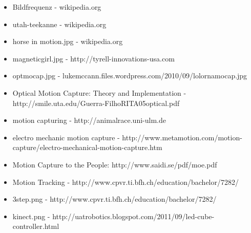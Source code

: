 \begin{itemize}
\item Bildfrequenz - wikipedia.org
\item utah-teekanne - wikipedia.org
\item horse in motion.jpg - wikipedia.org
\item magneticgirl.jpg - http://tyrell-innovations-usa.com
\item optmocap.jpg - lukemccann.files.wordpress.com/2010/09/lolornamocap.jpg
\item Optical Motion Capture: Theory and Implementation - http://smile.uta.edu/Guerra-FilhoRITA05optical.pdf
\item motion capturing - http://animalrace.uni-ulm.de
\item electro mechanic motion capture - http://www.metamotion.com/motion-capture/electro-mechanical-motion-capture.htm
\item Motion Capture to the People: http://www.saidi.se/pdf/moe.pdf
\item Motion Tracking - http://www.cpvr.ti.bfh.ch/education/bachelor/7282/
\item 3step.png - http://www.cpvr.ti.bfh.ch/education/bachelor/7282/
\item kinect.png - http://uatrobotics.blogspot.com/2011/09/led-cube-controller.html
\end{itemize}






